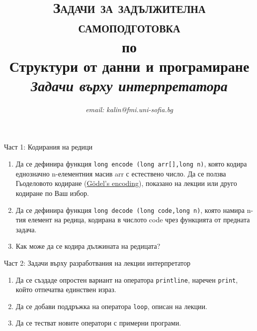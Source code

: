 \documentclass[12pt,a4paper]{article}
\author{\textit{email: kalin@fmi.uni-sofia.bg}}
\title{\textsc{Задачи за задължителна самоподготовка} \\
по \\
Структури от данни и програмиране\\
\textit{Задачи върху интерпретатора}}
\begin{document}
\maketitle

Част 1: Кодирания на редици

\begin{enumerate}
	\item Да се дефинира функция \texttt{long encode (long arr[],long n)}, която кодира еднозначно n-елементния масив arr с естествено число. Да се ползва Гьоделовото кодиране (\href{http://en.wikipedia.org/wiki/G%C3%B6del_numbering#G.C3.B6del.27s_encoding}{Gödel's encoding}), показано на лекции или друго кодиране по Ваш избор.
	\item Да се дефинира функция \texttt{long decode (long code,long n)}, която намира n-тия елемент на редица, кодирана в числото code чрез функцията от предната задача.
	\item Как може да се кодира дължината на редицата?
\end{enumerate}

Част 2: Задачи върху разработвания на лекции интерпретатор

\begin{enumerate}
	\item Да се създаде опростен вариант на оператора \texttt{printline}, наречен \texttt{print}, който отпечатва единствен израз.
	\item Да се добави поддръжка на оператора \texttt{loop}, описан на лекции.
	\item Да се тестват новите оператори с примерни програми.
\end{enumerate}
\end{document}
